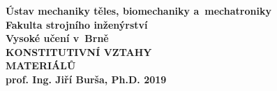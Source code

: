 \documentclass[a4paper, 12pt, oneside]{report}
\numberwithin{equation}{part}
\begin{document}
\begin{titlepage}
\pagecolor{fsimodra}
\color{white}
\renewcommand{\thepage}{cover}
\centering
\bfseries
{Ústav mechaniky těles, biomechaniky a~mechatroniky\\Fakulta strojního inženýrství\\Vysoké učení v~Brně\\}
\vfill
{\Huge KONSTITUTIVNÍ VZTAHY\\MATERIÁLŮ\\}
\vfill
{\LARGE prof. Ing. Jiří Burša, Ph.D.}
\vfill
2019
\end{titlepage}

\clearpage
\nopagecolor
\color{black}
\tableofcontents
\clearpage
{}





\appendix

\end{document}
